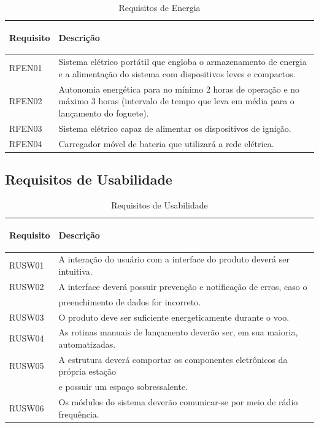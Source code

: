 \begin{table}[H]
\centering
\begin{tabular}{ | m{2cm} | m{12cm}|} 
 \hline
 \textbf{Requisito} & \begin{center} \textbf{Descrição }\end{center}\\ 
 \hline
 RFEN01 & Sistema elétrico portátil que engloba o armazenamento de  energia e a alimentação do sistema  com dispositivos leves e compactos.\\
 \hline
 RFEN02 &  Autonomia energética para no mínimo 2 horas de operação e no máximo 3 horas (intervalo de tempo que leva em média para o lançamento do foguete). \\ 
 \hline
 RFEN03 & Sistema elétrico capaz de alimentar os dispositivos de ignição. \\
 \hline
 RFEN04 & Carregador móvel de bateria que utilizará a rede elétrica.\\

 \hline
\end{tabular}
\label{Requisitos de Energia}
\caption{Requisitos de Energia}
\end{table}


\subsection{Requisitos de Usabilidade }

\begin{table}[H]
\centering
\begin{tabular}{ | m{2cm} | m{12cm}| } 
 \hline
 \textbf{Requisito} & \begin{center} \textbf{Descrição} \end{center}\\ 
 \hline
 RUSW01  & A interação do usuário com a interface do produto deverá ser intuitiva.\\
 \hline
 RUSW02 & A interface deverá possuir prevenção e notificação de erros, caso o \\& preenchimento de dados for incorreto. \\ 
 \hline
 RUSW03 & O produto deve ser suficiente energeticamente durante o voo.\\ 
 \hline
 RUSW04 & As rotinas manuais de lançamento deverão ser, em sua maioria,  automatizadas.\\ 
 \hline
 RUSW05 & A estrutura deverá comportar os componentes eletrônicos da própria estação \\& e possuir um espaço sobressalente. \\ 
 \hline
 RUSW06 & Os módulos do sistema deverão comunicar-se por meio de rádio frequência.\\ 
 \hline
 
\end{tabular}
\label{Requisitos de Usabilidade}
\caption{Requisitos de Usabilidade}
\end{table}

